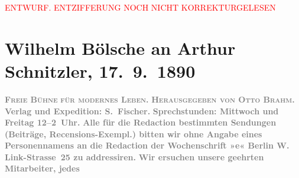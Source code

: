 
\begin{center}
            \textcolor{red}{ENTWURF. ENTZIFFERUNG NOCH NICHT KORREKTURGELESEN}
                      \end{center}
            
               \section[Wilhelm Bölsche an Arthur Schnitzler, 17. 9. 1890]{ Wilhelm Bölsche an Arthur Schnitzler, 17. 9. 1890}\nopagebreak{}\rehead{ }\begin{ledgroupsized}[t]{13cm}\normalsize\beginnumbering{} \toendnotes[C]{\smallbreak\pagebreak[2]} 
\toendnotes[C]{\smallbreak}\pstart
           \noindent{}\centering{}{\pb}\textcolor{gray}{\textbf{\textsc{Freie Bühne}}}\pend
           \pstart
           \noindent{}\centering{}\textcolor{gray}{\textbf{\textsc{für modernes Leben.}}}\pend
           \pstart
           \noindent{}\centering{}\textcolor{gray}{\textbf{\textsc{Herausgegeben von \textbf{Otto Brahm}.}}}\pend
           \pstart
           \noindent{}\textcolor{gray}{\textbf{Verlag und Expedition: S. Fischer.}}\pend
           \pstart
           \textcolor{gray}{\textbf{Sprechstunden: Mittwoch und Freitag 12–2 Uhr.}}\pend
           \pstart
           \textcolor{gray}{\textbf{Alle für die Redaction bestimmten Sendungen (Beiträge,
                            Recensions-Exempl.) bitten wir \textbf{ohne Angabe eines
                                Personennamens} an die Redaction der Wochenschrift »e« Berlin W. Link-Strasse 25 zu
                            addressiren.}}\pend
           \pstart
           \textcolor{gray}{\textbf{Wir ersuchen unsere geehrten Mitarbeiter, jedes
}}
\end{ledgroupsized}
